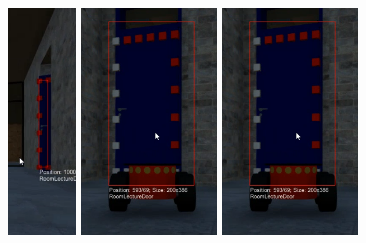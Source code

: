 \begin{figure}[htp]
{{        \includegraphics[height=6cm]{tex/img/ch05/Labelling_W2S05a.png}%
        \includegraphics[height=6cm]{tex/img/ch05/Labelling_W2S06.png}%
        \includegraphics[height=6cm]{tex/img/ch05/Labelling_W2S06.png}%
      }%
    }
    \setlength{\twosubht}{\ht\twosubbox}
    \centering
\end{figure}
